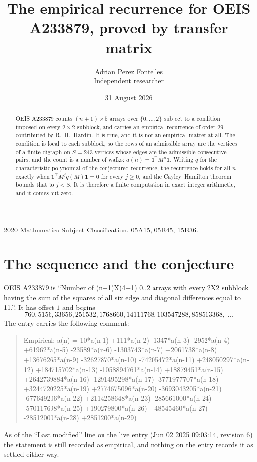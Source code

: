 \documentclass[11pt,a4paper]{article}
\title{The empirical recurrence for OEIS A233879, proved by transfer matrix}
\author{Adrian Perez Fontelles\\ \small Independent researcher}
\date{31 August 2026}
\theoremstyle{plain}
\theoremstyle{definition}
\begin{document}
\maketitle

\begin{abstract}
OEIS A233879 counts $(n+1)\times5$ arrays over $\{0,\dots,2\}$ subject to a condition imposed on
every $2\times2$ subblock, and carries an empirical recurrence of order $29$ contributed
by R.~H.~Hardin. It is true, and it is not an empirical matter at all. The condition is local
to each subblock, so the rows of an admissible array are the vertices of a finite digraph
on $S=243$ vertices whose edges are the admissible consecutive pairs, and the count is a
number of walks: $a(n)=\mathbf{1}^{\!\top}M^{n}\mathbf{1}$. Writing $q$
for the characteristic polynomial of the conjectured recurrence, the recurrence holds for all
$n$ exactly when $\mathbf{1}^{\!\top}M^{j}q(M)\mathbf{1}=0$ for every $j\ge0$, and the
Cayley--Hamilton theorem bounds that to $j<S$. It is therefore a finite computation in exact
integer arithmetic, and it comes out zero.
\end{abstract}

\noindent\small 2020 Mathematics Subject Classification. 05A15, 05B45, 15B36.\normalsize

\section{The sequence and the conjecture}

OEIS A233879 is ``Number of (n+1)X(4+1) 0..2 arrays with every 2X2 subblock having the sum of the squares of all six edge and diagonal differences equal to 11.''. It has offset $1$ and begins
\[
760, 5156, 33656, 251532, 1768660, 14111768, 103547288, 858513368,\ \dots
\]
The entry carries the following comment:
\begin{quote}\small
Empirical: a(n) = 10*a(n-1) +111*a(n-2) -1347*a(n-3) -2952*a(n-4) +61962*a(n-5) -23589*a(n-6) -1303743*a(n-7) +2061738*a(n-8) +13676265*a(n-9) -32627870*a(n-10) -74205472*a(n-11) +248050297*a(n-12) +184715702*a(n-13) -1058894761*a(n-14) +18879451*a(n-15) +2642739884*a(n-16) -1291495298*a(n-17) -3771977707*a(n-18) +3244720225*a(n-19) +2774675096*a(n-20) -3693043205*a(n-21) -677649206*a(n-22) +2114258648*a(n-23) -285661000*a(n-24) -570117698*a(n-25) +190279800*a(n-26) +48545460*a(n-27) -28512000*a(n-28) +2851200*a(n-29)
\end{quote}
As of the ``Last modified'' line on the live entry (Jun 02 2025 09:03:14, revision 6) the statement is
still recorded as empirical, and nothing on the entry records it as settled either way.
\end{document}
